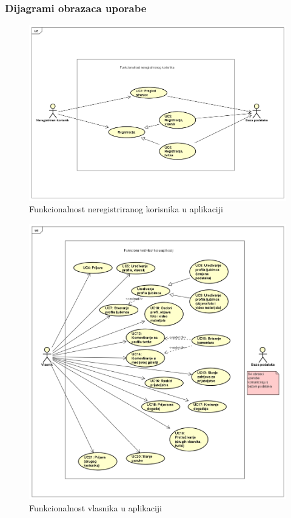 				\subsubsection{Dijagrami obrazaca uporabe}
					\begin{figure} 
						\includegraphics[width=\textwidth]{slike/funkc_neregistriranog_korisnika.png}
						\caption{Funkcionalnost neregistriranog korisnika u aplikaciji}
					\end{figure}
					\begin{figure} 
						\includegraphics[width=\textwidth]{slike/funkcionalnost_vlasnika.png}
						\caption{Funkcionalnost vlasnika u aplikaciji}
					\end{figure}

